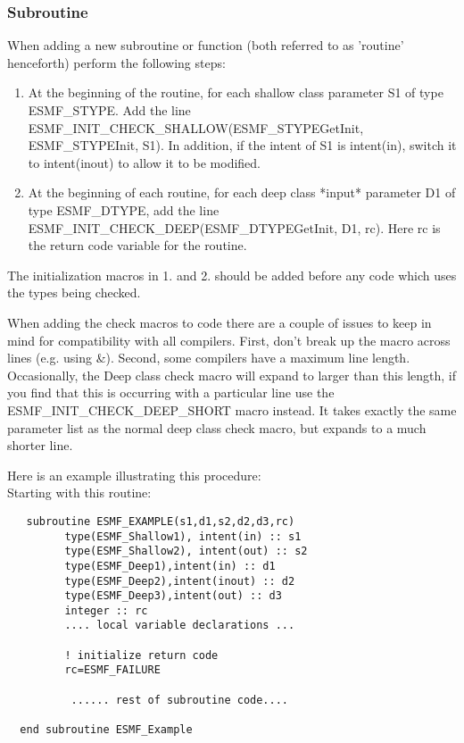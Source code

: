 \subsubsection{Subroutine}

   When adding a new subroutine or function (both referred 
to as 'routine' henceforth) perform the following steps:

\begin{enumerate}
\item At the beginning of the routine, for each shallow
      class parameter S1 of type ESMF\_STYPE. Add the line
      ESMF\_INIT\_CHECK\_SHALLOW(ESMF\_STYPEGetInit, ESMF\_STYPEInit, S1).
      In addition, if the intent of S1 is intent(in), switch it to 
      intent(inout) to allow it to be modified.  

\item At the beginning of each routine, for each deep
     class *input* parameter D1 of type ESMF\_DTYPE, add the line
     ESMF\_INIT\_CHECK\_DEEP(ESMF\_DTYPEGetInit, D1, rc). 
     Here rc is the return code variable
     for the routine.
\end{enumerate}

 The initialization macros in 1. and 2. should be
added before any code which uses the types being checked. 

  When adding the check macros to code there are a couple of issues
to keep in mind for compatibility with all compilers. First, 
don't break up the macro across lines (e.g. using \&). 
Second, some compilers have a maximum line length. Occasionally, 
the Deep class check macro will expand to larger than this
length, if you find that this is occurring with a particular
line use the ESMF\_INIT\_CHECK\_DEEP\_SHORT macro instead. 
It takes exactly the same parameter list as the normal deep class
check macro, but expands to a much shorter line. 

 Here is an example illustrating this procedure: \\

Starting with this routine:

\begin{verbatim}
   subroutine ESMF_EXAMPLE(s1,d1,s2,d2,d3,rc)
         type(ESMF_Shallow1), intent(in) :: s1
         type(ESMF_Shallow2), intent(out) :: s2
         type(ESMF_Deep1),intent(in) :: d1
         type(ESMF_Deep2),intent(inout) :: d2
         type(ESMF_Deep3),intent(out) :: d3
         integer :: rc
         .... local variable declarations ...

         ! initialize return code
         rc=ESMF_FAILURE

          ...... rest of subroutine code....

  end subroutine ESMF_Example
\end{verbatim}

